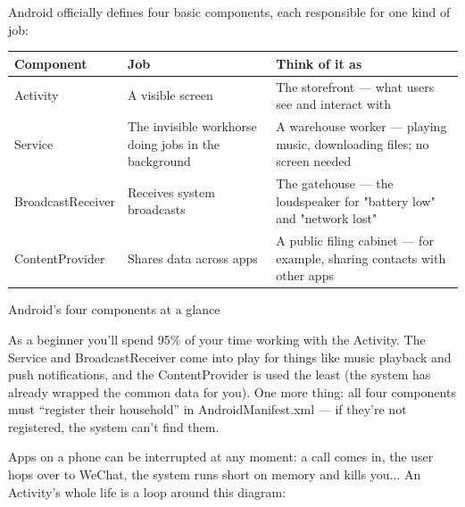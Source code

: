 


Android officially defines four basic components, each responsible for one kind of job:

\begin{center}
\begin{tabularx}{\linewidth}{|X|X|X|}
\hline
\textbf{Component} & \textbf{Job} & \textbf{Think of it as} \tabularnewline
\hline
Activity & A visible screen & The storefront — what users see and interact with \tabularnewline
Service & The invisible workhorse doing jobs in the background & A warehouse worker — playing music, downloading files; no screen needed \tabularnewline
BroadcastReceiver & Receives system broadcasts & The gatehouse — the loudspeaker for "battery low" and "network lost" \tabularnewline
ContentProvider & Shares data across apps & A public filing cabinet — for example, sharing contacts with other apps \tabularnewline
\hline
\end{tabularx}
\end{center}

\begin{center}\small\color{gray}Android's four components at a glance\end{center}

As a beginner you'll spend 95\% of your time working with the Activity. The Service and BroadcastReceiver come into play for things like music playback and push notifications, and the ContentProvider is used the least (the system has already wrapped the common data for you). One more thing: all four components must “register their household” in AndroidManifest.xml — if they're not registered, the system can't find them.


Apps on a phone can be interrupted at any moment: a call comes in, the user hops over to WeChat, the system runs short on memory and kills you... An Activity's whole life is a loop around this diagram:

